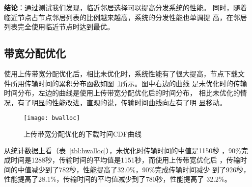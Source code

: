 

%

\textbf{结论}：通过测试我们发现，临近邻居选择可以提高分发系统的性能。
同时，随着临近节点占节点邻居列表的比例越来越高，系统的分发性能也单调提
高，在邻居列表完全使用临近节点时达到最优。



\subsection{带宽分配优化}


使用上传带宽分配优化后，相比未优化时，系统性能有了很大提高，节点下载文
件所用传输时间的累积分布函数如图~\ref{fig:bwalloc}所示。图中右边的曲线
是未优化时的传输时间分布，左边的曲线是使用上传带宽分配优化后的时间分布，
相比未优化的情况，有了明显的性能改进，直观的说，传输时间曲线向左有了明
显移动。

\begin{figure}[htbp]
  \centering
  \begin{minipage}{0.6\linewidth}
    \centering
    \texttt{[image: bwalloc]}
    \caption{上传带宽分配优化的下载时间CDF曲线}
    \label{fig:bwalloc}
  \end{minipage}
\end{figure}

从统计数据上看（表~\ref{tbl:bwalloc}），未优化时传输时间的中值是1150秒
，90\%完成时间是1288秒，传输时间的平均值是1151秒，而使用上传带宽优化后
，传输时间的中值减少到了782秒，性能提高了32.0\%，90\%完成传输时间减少
到了926秒，性能提高了28.1\%，传输时间的平均值减少到了780秒，性能提高了
32.2\%。


